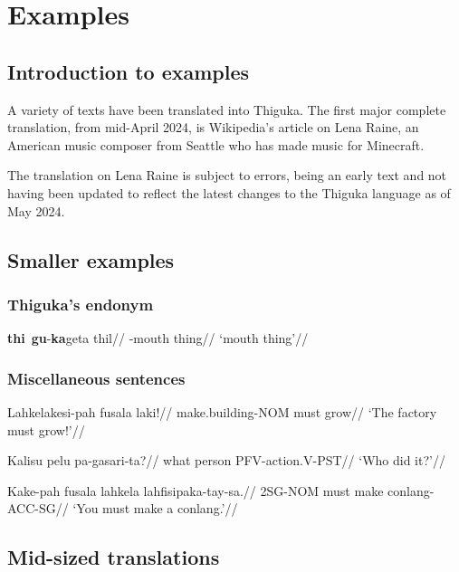 
\part{Examples}
\chapter{Introduction to examples}
A variety of texts have been translated into Thiguka. The first major complete translation, from mid-April 2024, is Wikipedia's article on Lena Raine, an American music composer from Seattle who has made music for Minecraft.

The translation on Lena Raine is subject to errors, being an early text and not having been updated to reflect the latest changes to the Thiguka language as of May 2024.

\chapter{Smaller examples}

\section{Thiguka's endonym}
\ex
\begingl
    \gla \textbf{thi}~\textbf{gu}-\textbf{ka}geta thil//
    \glb \agradj{}-mouth thing//
    \glft `mouth thing'//
\endgl
\xe

\section{Miscellaneous sentences}

\ex
\begingl
    \gla Lahkelakesi-pah fusala laki!//
    \glb make.building-NOM must grow//
    \glft `The factory must grow!'//
\endgl
\xe

\ex
\begingl
    \gla Kalisu pelu pa-gasari-ta?//
    \glb what person PFV-action.V-PST//
    \glft `Who did it?'//
\endgl
\xe

\ex
\begingl
    \gla Kake-pah fusala lahkela lahfisipaka-tay-sa.//
    \glb 2SG-NOM must make conlang-ACC-SG//
    \glft `You must make a conlang.'//
\endgl
\xe




\chapter{Mid-sized translations}




